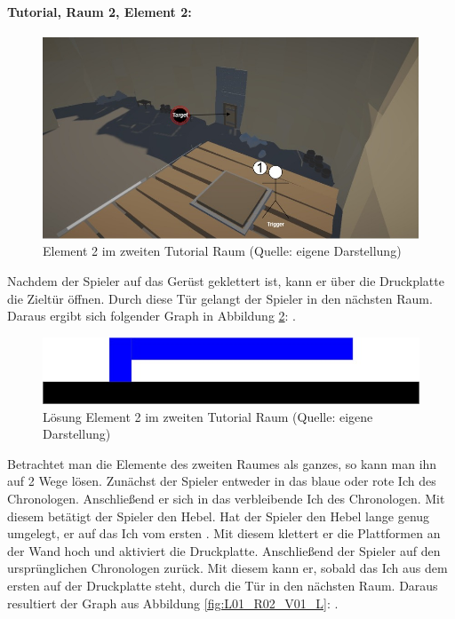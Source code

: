 \paragraph{Tutorial, Raum 2, Element 2:}

\begin{figure}[ht]
\centering
\includegraphics[width=0.8\linewidth]{content/pictures/Raetsel-L01_R02_R02.jpg}
\caption{Element 2 im zweiten Tutorial Raum (Quelle: eigene Darstellung)}
\label{fig:L01_R02_R02}
\end{figure}

Nachdem der Spieler auf das Gerüst geklettert ist, kann er über die Druckplatte die Zieltür öffnen. Durch diese Tür gelangt der Spieler in den nächsten Raum. Daraus ergibt sich folgender Graph in Abbildung \ref{fig:L01_R02_R02_L}: .

\begin{figure}[ht]
\centering
\includegraphics[width=0.8\linewidth]{content/pictures/Raetsel-L01_R02_R02_Loesung.jpg}
\caption{Lösung Element 2 im zweiten Tutorial Raum (Quelle: eigene Darstellung)}
\label{fig:L01_R02_R02_L}
\end{figure}

Betrachtet man die Elemente des zweiten Raumes als ganzes, so kann man ihn auf 2 Wege lösen. Zunächst  der Spieler entweder in das blaue oder rote Ich des Chronologen. Anschließend  er sich in das verbleibende Ich des Chronologen. Mit diesem betätigt der Spieler den Hebel. Hat der Spieler den Hebel lange genug umgelegt,  er auf das Ich vom ersten . Mit diesem klettert er die Plattformen an der Wand hoch und aktiviert die Druckplatte. Anschließend  der Spieler auf den ursprünglichen Chronologen zurück. Mit diesem kann er, sobald das Ich aus dem ersten  auf der Druckplatte steht, durch die Tür in den nächsten Raum. Daraus resultiert der Graph aus Abbildung \ref{fig:L01_R02_V01_L}: .

